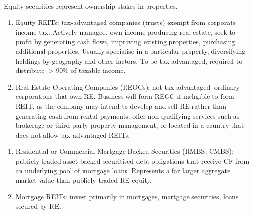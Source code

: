 \begin{remark} \\
Equity securities represent ownership stakes in properties.
\begin{enumerate}[label=\roman*.]
\setlength{\itemsep}{0pt}
\item Equity REITs: tax-advantaged companies (trusts) exempt from corporate income tax. Actively managed, own income-producing real estate, seek to profit by generating cash flows, improving existing properties, purchasing additional properties. Usually specialise in a particular property, diversifying holdings by geography and other factors. To be tax advantaged, required to distribute $> 90\%$ of taxable income.
\item Real Estate Operating Companies (REOCs): not tax advantaged; ordinary corporations that own RE. Business will form REOC if ineligible to form REIT, as the company may intend to develop and sell RE rather than generating cash from rental payments, offer non-qualifying services such as brokerage or third-party property management, or located in a country that does not allow tax-advantaged REITs.
\end{enumerate}
\end{remark}

\begin{remark} 
\begin{enumerate}[label=\roman*.]
\setlength{\itemsep}{0pt}
\item Residential or Commercial Mortgage-Backed Securities (RMBS, CMBS): publicly traded asset-backed securitised debt obligations that receive CF from an underlying pool of mortgage loans. Represents a far larger aggregate market value than publicly traded RE equity.
\item Mortgage REITs: invest primarily in mortgages, mortgage securities, loans secured by RE.
\end{enumerate}
\end{remark}

